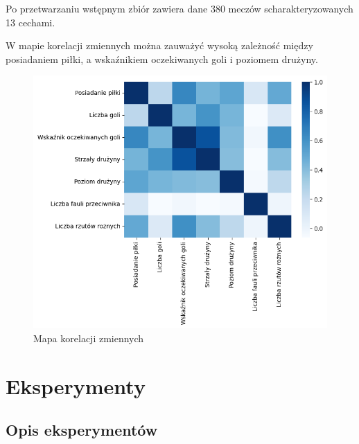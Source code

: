 \documentclass[11pt]{article}
\renewcommand{\thesection}{\Roman{section}}
\renewcommand{\thesubsection}{\Alph{subsection}}
\begin{document}
Po przetwarzaniu wstępnym zbiór zawiera dane 380 meczów scharakteryzowanych 13 cechami. 

W mapie korelacji zmiennych można zauważyć wysoką zależność między posiadaniem piłki, a wskaźnikiem oczekiwanych goli i poziomem drużyny.

\begin{figure}[hbt]
\includegraphics[scale=0.35]{heatmap.png}
\caption{Mapa korelacji zmiennych}
\end{figure}


\section{Eksperymenty}
\renewcommand{\thesubsection}{\arabic{subsection}}
\subsection{Opis eksperymentów}
\end{document}
